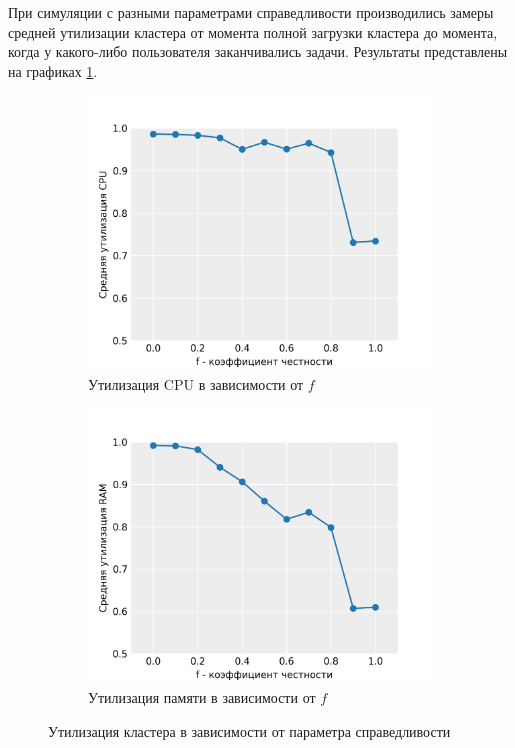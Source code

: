 При симуляции с разными параметрами справедливости производились замеры средней утилизации кластера от момента полной загрузки кластера до момента, когда у какого-либо пользователя заканчивались задачи. Результаты представлены на графиках \ref{fig:utilization-results}.

\begin{figure}[h!]
    \centering 
    \begin{subfigure}{0.49\linewidth}
        \centering
        \includegraphics[width=\linewidth]{images/cpu_utilization}
        \caption{Утилизация CPU в зависимости от $f$}
    \end{subfigure}
    \begin{subfigure}{0.49\linewidth}
        \centering
        \includegraphics[width=\linewidth]{images/memory_utilization}
        \caption{Утилизация памяти в зависимости от $f$}
    \end{subfigure}
    \caption{Утилизация кластера в зависимости от параметра справедливости}
    \label{fig:utilization-results}
\end{figure}

